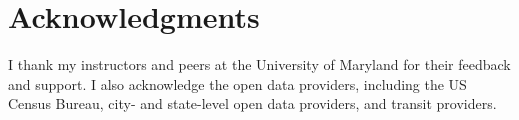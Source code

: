 \documentclass[sigconf,nonacm]{acmart}
\begin{document}
\section{Acknowledgments}

I thank my instructors and peers at the University of Maryland for their feedback and support. I also acknowledge the open data providers, including the US Census Bureau, city- and state-level open data providers, and transit providers.



\end{document}
